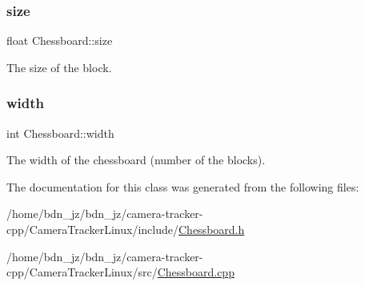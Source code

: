 \subsubsection{\texorpdfstring{size}{size}}
{\footnotesize\ttfamily float Chessboard\+::size\hspace{0.3cm}{\ttfamily [private]}}

The size of the block. \mbox{\label{class_chessboard_a508e83c453e3aef8af69bdb934262d83}} 
\subsubsection{\texorpdfstring{width}{width}}
{\footnotesize\ttfamily int Chessboard\+::width\hspace{0.3cm}{\ttfamily [private]}}

The width of the chessboard (number of the blocks). 

The documentation for this class was generated from the following files\+:\begin{DoxyCompactItemize}
\item 
/home/bdn\+\_\+jz/bdn\+\_\+jz/camera-\/tracker-\/cpp/\+Camera\+Tracker\+Linux/include/\hyperlink{_chessboard_8h}{Chessboard.\+h}\item 
/home/bdn\+\_\+jz/bdn\+\_\+jz/camera-\/tracker-\/cpp/\+Camera\+Tracker\+Linux/src/\hyperlink{_chessboard_8cpp}{Chessboard.\+cpp}\end{DoxyCompactItemize}
